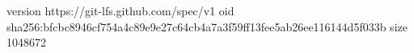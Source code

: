 version https://git-lfs.github.com/spec/v1
oid sha256:bfcbc8946cf754a4c89e9e27c64cb4a7a3f59ff13fee5ab26ee116144d5f033b
size 1048672
